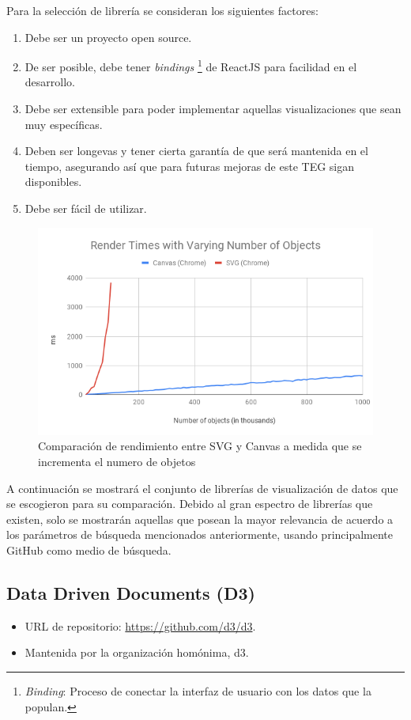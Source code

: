 Para la selección de librería se consideran los siguientes factores:

\begin{enumerate}
    \item {Debe ser un proyecto open source.}
    \item {De ser posible, debe tener \textit{bindings} \footnote{\textit{Binding}: Proceso de conectar la interfaz de usuario con los datos que la populan.} de ReactJS para facilidad en el desarrollo.}
    \item {Debe ser extensible para poder implementar aquellas visualizaciones que sean muy específicas.}
    \item {Deben ser longevas y tener cierta garantía de que será mantenida en el tiempo,
    asegurando así que para futuras mejoras de este TEG sigan disponibles.}
    \item {Debe ser fácil de utilizar.}
\end{enumerate}

\begin{figure}[H]
    \centering
    \includegraphics[width=\textwidth]{seminario/images/svg-vs-canvas.png}
    \caption{Comparación de rendimiento entre SVG y Canvas a medida que se incrementa el numero de objetos}
    \label{fig:canvasvssvg}
\end{figure}

A continuación se mostrará el conjunto de librerías de visualización de datos que se escogieron para su comparación. Debido al gran espectro de librerías que existen, solo se mostrarán aquellas que posean la mayor relevancia de acuerdo a los parámetros de búsqueda mencionados anteriormente, usando principalmente GitHub como medio de búsqueda.

\subsection{ Data Driven Documents (D3) }
\begin{itemize}
    \item URL de repositorio: \href{https://github.com/d3/d3}{https://github.com/d3/d3}.
    \item Mantenida por la organización homónima, d3.
\end{itemize}

